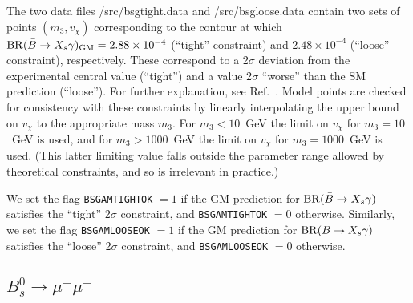 \documentclass[11pt]{article}
\begin{document}
The two data files /src/bsgtight.data and /src/bsgloose.data contain two sets of points $(m_3, v_{\chi})$ corresponding to the contour at which ${\rm BR}(\bar B \to X_s \gamma)_{\rm GM} = 2.88 \times 10^{-4}$ (``tight'' constraint) and $2.48 \times 10^{-4}$ (``loose'' constraint), respectively.  These correspond to a 2$\sigma$ deviation from the experimental central value (``tight'') and a value 2$\sigma$ ``worse'' than the SM prediction (``loose'').  For further explanation, see Ref.~\cite{indirect}.  Model points are checked for consistency with these constraints by linearly interpolating the upper bound on $v_{\chi}$ to the appropriate mass $m_3$.  For $m_3 < 10$~GeV the limit on $v_{\chi}$ for $m_3 = 10$~GeV is used, and for $m_3 > 1000$~GeV the limit on $v_{\chi}$ for $m_3 = 1000$~GeV is used.  (This latter limiting value falls outside the parameter range allowed by theoretical constraints, and so is irrelevant in practice.)

We set the flag {\tt BSGAMTIGHTOK} $=1$ if the GM prediction for ${\rm BR}(\bar B \to X_s \gamma)$ satisfies the ``tight'' 2$\sigma$ constraint, and {\tt BSGAMTIGHTOK} $=0$ otherwise.
Similarly, we set the flag {\tt BSGAMLOOSEOK} $=1$ if the GM prediction for ${\rm BR}(\bar B \to X_s \gamma)$ satisfies the ``loose'' 2$\sigma$ constraint, and {\tt BSGAMLOOSEOK} $=0$ otherwise.



\subsection{$B_s^0 \to \mu^+ \mu^-$}
\end{document}
